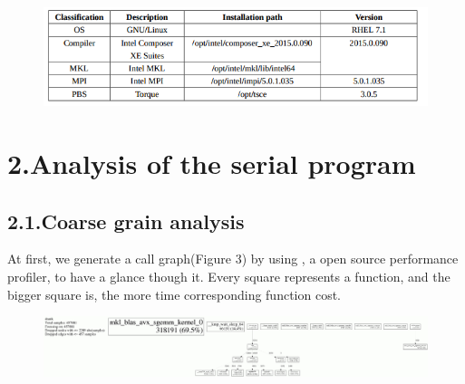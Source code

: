 \documentclass{article}
\begin{document}
\begin{figure}[tbp]%
\begin{mdcenter}%

\noindent{}\includegraphics[keepaspectratio=true,width=\dimmin{}{\dimwidth{0.90}}]{images/2016-02-18-23-13-11-}{}%

\mdhr{}%

\noindent{}%
\end{mdcenter}\label{fig-myfigure}%
\end{figure}%

\section{2.\hspace*{0.5em}Analysis of the serial program}\label{sec-analysis-of-the-serial-program}%

\subsection{2.1.\hspace*{0.5em}Coarse grain analysis}\label{sec-coarse-grain-analysis}%

\noindent{}At first, we generate a call graph(Figure 3) by using , a open source performance profiler, to have a glance though it. Every square represents a function, and the bigger square is, the more time corresponding function cost.%

\begin{figure}[tbp]%
\begin{mdcenter}%

\noindent{}\includegraphics[keepaspectratio=true,width=\dimmin{}{\dimwidth{0.90}}]{images/100001994364201}{}%

\mdhr{}%

\noindent{}%
\end{mdcenter}\label{fig-myfigure}%
\end{figure}%
\end{document}
